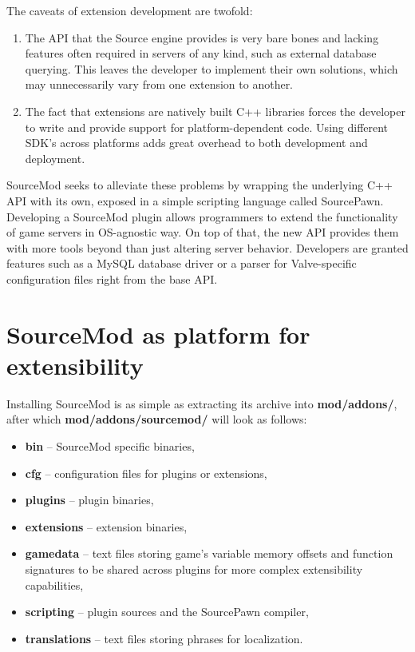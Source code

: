 The caveats of extension development are twofold:
\begin{enumerate}
\item
The API that the Source engine provides is very bare bones and lacking features often required in servers of any kind, such as external database querying.
This leaves the developer to implement their own solutions, which may unnecessarily vary from one extension to another.
\item
The fact that extensions are natively built C++ libraries forces the developer to write and provide support for platform-dependent code.
Using different SDK's across platforms adds great overhead to both development and deployment.
\end{enumerate}
SourceMod seeks to alleviate these problems by wrapping the underlying C++ API with its own, exposed in a simple scripting language called SourcePawn.
Developing a SourceMod plugin allows programmers to extend the functionality of game servers in OS-agnostic way.
On top of that, the new API provides them with more tools beyond than just altering server behavior.
Developers are granted features such as a MySQL database driver or a parser for Valve-specific configuration files right from the base API.

\section{SourceMod as platform for extensibility}

Installing SourceMod is as simple as extracting its archive into \textbf{mod/addons/}, after which \textbf{mod/addons/sourcemod/} will look as follows:
\begin{itemize}
    \item \textbf{bin} -- SourceMod specific binaries,
    \item \textbf{cfg} -- configuration files for plugins or extensions,
    \item \textbf{plugins} -- plugin binaries,
    \item \textbf{extensions} -- extension binaries,
    \item \textbf{gamedata} -- text files storing game's variable memory offsets and function signatures to be shared across plugins for more complex extensibility capabilities,
    \item \textbf{scripting} -- plugin sources and the SourcePawn compiler,
    \item \textbf{translations} -- text files storing phrases for localization.
\end{itemize}

